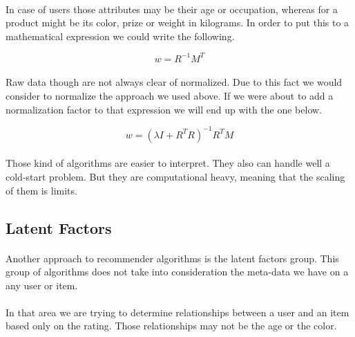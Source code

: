 \paragraph{}In case of users those attributes may be their age or occupation, whereas for a product might be its color, prize or weight in kilograms. In order to put this to a mathematical expression we could write the following.

\begin{equation}
w=R^{-1}M^{T}
\end{equation}

\paragraph{}Raw data though are not always clear of normalized. Due to this fact we would consider to normalize the approach we used above. If we were about to add a normalization factor to that expression we will end up with the one below.

\begin{equation}
w=(\lambda I + R^{T}R)^{-1} R^{T}M 
\end{equation}

\paragraph{}Those kind of algorithms are easier to interpret. They also can handle well a cold-start problem. But they are computational heavy, meaning that the scaling of them is limits.

\subsection{Latent Factors}

\paragraph{}Another approach to recommender algorithms is the latent factors group. This group of algorithms does not take into consideration the meta-data we have on a any user or item. 
\paragraph{}In that area we are trying to determine relationships between a user and an item based only on the rating. Those relationships may not be the age or the color.

